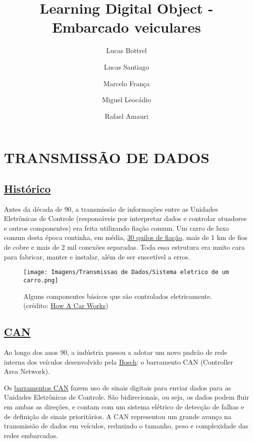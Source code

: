 \documentclass{article}
\title{Learning Digital Object - Embarcado veiculares}
\author{Lucas Bottrel \and Lucas Santiago \and Marcelo França \and Miguel Leocádio \and Rafael Amauri}
\date{}
\begin{document}
\maketitle

\newpage

\section*{TRANSMISSÃO DE DADOS}
\subsection*{\underline{Histórico}}

\hspace{4pt} Antes da década de 90, a transmissão de informações entre as Unidades Eletrônicas de Controle (responsáveis por 
interpretar dados e controlar atuadores e outros componentes) era feita utilizando fiação comum. Um carro de luxo 
comum desta época continha, em média, \href{https://www.youtube.com/watch?v=ptH8zxhf-jM}{30 quilos de fiação}, mais de 1 km de fios de cobre e mais de 2 mil conexões separadas. 
Toda essa estrutura era muito cara para fabricar, manter e instalar, além de ser suscetível a erros.


\begin{figure}[ht]
    \centering
    \texttt{[image: Imagens/Transmissao de Dados/Sistema eletrico de um carro.png]}
    \caption{Alguns componentes básicos que são controlados eletricamente. (crédito: \href{https://www.howacarworks.com/basics/how-car-electrical-systems-work}{How A Car Works})}
\end{figure}


\subsection*{\underline{CAN}}

\hspace{4pt} Ao longo dos anos 90, a indústria passou a adotar um novo padrão de rede interna dos veículos desenvolvido pela \href{http://esd.cs.ucr.edu/webres/can20.pdf}{Bosch}: o barramento CAN (Controller Area Network).

Os \href{https://www.youtube.com/watch?v=5eh8Poz5g7M}{barramentos CAN} fazem uso de sinais digitais para enviar dados para as Unidades Eletrônicas de Controle. São bidirecionais, ou seja, os dados podem fluir em ambas as direções, e contam com um sistema elétrico de detecção de falhas e de definição de sinais prioritários. A CAN representou um grande avanço na transmissão de dados em veículos, reduzindo o tamanho, peso e complexidade das redes embarcadas.
\end{document}
